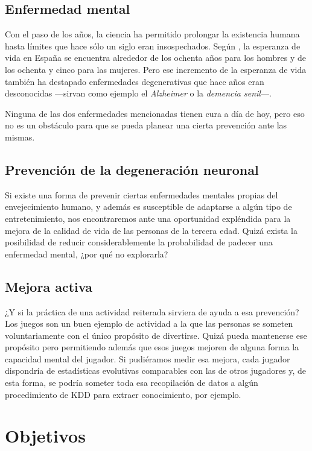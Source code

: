 \subsection{Enfermedad mental}

Con el paso de los años, la ciencia ha permitido prolongar la existencia humana hasta límites que hace sólo un siglo eran insospechados. Según \cite{ine-esperanza}, la esperanza de vida en España se encuentra alrededor de los ochenta años para los hombres y de los ochenta y cinco para las mujeres. Pero ese incremento de la esperanza de vida también ha destapado enfermedades degenerativas que hace años eran desconocidas ---sirvan como ejemplo el {\it Alzheimer} o la {\it demencia senil}---.

Ninguna de las dos enfermedades mencionadas tienen cura a día de hoy, pero eso no es un obstáculo para que se pueda planear una cierta prevención ante las mismas.

\subsection{Prevención de la degeneración neuronal}

Si existe una forma de prevenir ciertas enfermedades mentales propias del envejecimiento humano, y además es susceptible de adaptarse a algún tipo de entretenimiento, nos encontraremos ante una oportunidad expléndida para la mejora de la calidad de vida de las personas de la tercera edad. Quizá exista la posibilidad de reducir considerablemente la probabilidad de padecer una enfermedad mental, ¿por qué no explorarla?

\subsection{Mejora activa}

¿Y si la práctica de una actividad reiterada sirviera de ayuda a esa prevención? Los juegos son un buen ejemplo de actividad a la que las personas se someten voluntariamente con el único propósito de divertirse. Quizá pueda mantenerse ese propósito pero permitiendo además que esos juegos mejoren de alguna forma la capacidad mental del jugador. Si pudiéramos medir esa mejora, cada jugador dispondría de estadísticas evolutivas comparables con las de otros jugadores y, de esta forma, se podría someter toda esa recopilación de datos a algún procedimiento de \acf{KDD} para extraer conocimiento, por ejemplo.

\section{Objetivos}
\label{sec::objetivos}

